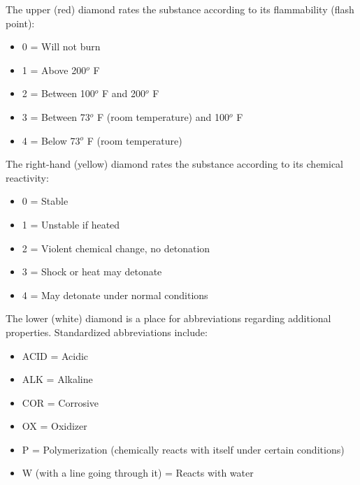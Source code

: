 \vskip 10pt

The upper (red) diamond rates the substance according to its flammability (flash point):

\begin{itemize}
\item{} 0 = Will not burn
\item{} 1 = Above 200$^{o}$ F
\item{} 2 = Between 100$^{o}$ F and 200$^{o}$ F
\item{} 3 = Between 73$^{o}$ F (room temperature) and 100$^{o}$ F
\item{} 4 = Below 73$^{o}$ F (room temperature)
\end{itemize} 

\vskip 10pt

The right-hand (yellow) diamond rates the substance according to its chemical reactivity:

\begin{itemize}
\item{} 0 = Stable
\item{} 1 = Unstable if heated
\item{} 2 = Violent chemical change, no detonation
\item{} 3 = Shock or heat may detonate
\item{} 4 = May detonate under normal conditions
\end{itemize} 

\vskip 10pt

The lower (white) diamond is a place for abbreviations regarding additional properties.  Standardized abbreviations include:

\begin{itemize}
\item{} ACID = Acidic
\item{} ALK = Alkaline
\item{} COR = Corrosive
\item{} OX = Oxidizer
\item{} P = Polymerization (chemically reacts with itself under certain conditions)
\item{} W (with a line going through it) = Reacts with water
\end{itemize} 











